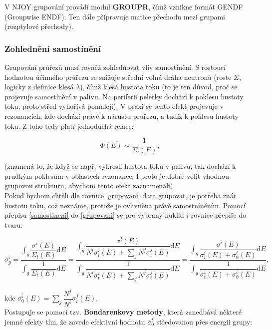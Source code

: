 V NJOY grupování provádí modul \textbf{GROUPR}, čímž vznikne formát GENDF (Groupwise ENDF). Ten dále připravuje matice přechodu mezi grupami (rozptylové přechody).

\subsubsection{Zohlednění samostínění}

Grupování průřezů musí rovněž zohledňovat vliv samostínění. S rostoucí hodnotou účinného průřezu se snižuje střední volná dráha neutronů (roste $\Sigma$, logicky z definice klesá $\lambda$), čímž klesá hustota toku (to je ten důvod, proč se projevuje samostínění v palivu. Na periferii peletky dochází k poklesu hustoty toku, proto střed vyhořívá pomaleji). V praxi se tento efekt projevuje v rezonancích, kde dochází právě k nárůstu průřezu, a tudíž k poklesu hustoty toku. Z toho tedy platí jednoduchá relace:

\begin{equation}
  \boxed{
    \Phi(E) \sim \dfrac{1}{\Sigma_t(E)},}
    \label{samostineni}
\end{equation}

\noindent (znamená to, že když se např. vykreslí hustota toku v palivu, tak dochází k prudkým poklesům v oblastech rezonance. I proto je dobré volit vhodnou grupovou strukturu, abychom tento efekt zaznamenali).\\

Pokud bychom chtěli dle rovnice \eqref{grupovani} data grupovat, je potřeba znát hustotu toku, což neznáme, protože je ovlivněna právě samostníněním. Pomocí přepisu \eqref{samostineni} do \eqref{grupovani} se pro vybraný nuklid $i$ rovnice přepíše do tvaru:

$$ \bar{\sigma}_g^i = \dfrac{\int_g \dfrac{\sigma^i(E)}{\Sigma_t(E)} \text{d}E}{\int_g \dfrac{1}{\Sigma_t(E)} \text{d}E} = \dfrac{\int_g \dfrac{\sigma^i(E)}{N^i \sigma_t^i(E) + \sum_j N^j \sigma_t^j(E)} \text{d}E}{\int_g \dfrac{1}{N^i \sigma_t^i(E) + \sum_j N^j \sigma_t^j(E)} \text{d}E} = \dfrac{\int_g \dfrac{\sigma^i(E)}{\sigma_t^i(E) + \sigma_0^i(E)} \text{d}E}{\int_g \dfrac{1}{\sigma_t^i(E) + \sigma_0^i(E)} \text{d}E},$$

\noindent kde $\sigma_0^i(E) = \sum_j \dfrac{N^j}{N^i} \sigma_t^j(E).$\\

Postupuje se pomocí tzv. \textbf{Bondarenkovy metody}, která zanedbává některé jemné efekty tím, že zavede efektivní hodnotu $\bar{\sigma}_0^i$ středovanou přes energii grupy:

